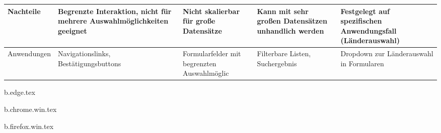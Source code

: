 \begin{table}[ht!]
{\begin{tabular}{ p{2.5cm} || p{2.8cm} | p{3.3cm} | p{3.3cm} | p{3.3cm} }
            \TBstrut Nachteile & Begrenzte Interaktion, nicht für mehrere Auswahlmöglichkeiten geeignet & Nicht skalierbar für große Datensätze & Kann mit sehr großen Datensätzen unhandlich werden & Festgelegt auf spezifischen Anwendungsfall (Länderauswahl) \\
            \hline
            \TBstrut Anwendungen & Navigationslinks, Bestätigungsbuttons & Formularfelder mit begrenzten Auswahlmöglic & Filterbare Listen, Suchergebnis & Dropdown zur Länderauswahl in Formularen \\
        \end{tabular}
    }
\end{table}

{b.edge.tex}

{b.chrome.win.tex}

{b.firefox.win.tex}





\cite{online}
